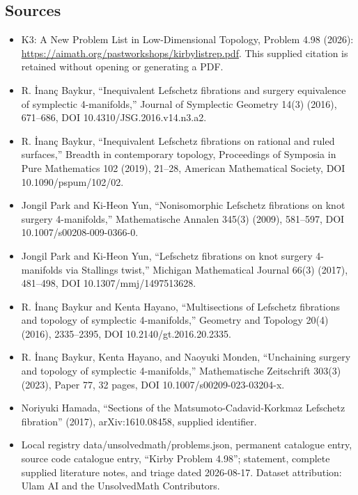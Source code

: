 \documentclass[11pt]{article}
\begin{document}
\subsection{Sources}
\begin{itemize}
\item K3: A New Problem List in Low-Dimensional Topology, Problem 4.98 (2026): \url{https://aimath.org/pastworkshops/kirbylistrep.pdf}. This supplied citation is retained without opening or generating a PDF.
\item [Bay16] R. İnanç Baykur, ``Inequivalent Lefschetz fibrations and surgery equivalence of symplectic 4-manifolds,'' Journal of Symplectic Geometry 14(3) (2016), 671--686, DOI 10.4310/JSG.2016.v14.n3.a2.
\item [Bay19] R. İnanç Baykur, ``Inequivalent Lefschetz fibrations on rational and ruled surfaces,'' Breadth in contemporary topology, Proceedings of Symposia in Pure Mathematics 102 (2019), 21--28, American Mathematical Society, DOI 10.1090/pspum/102/02.
\item [PY09] Jongil Park and Ki-Heon Yun, ``Nonisomorphic Lefschetz fibrations on knot surgery 4-manifolds,'' Mathematische Annalen 345(3) (2009), 581--597, DOI 10.1007/s00208-009-0366-0.
\item [PY17] Jongil Park and Ki-Heon Yun, ``Lefschetz fibrations on knot surgery 4-manifolds via Stallings twist,'' Michigan Mathematical Journal 66(3) (2017), 481--498, DOI 10.1307/mmj/1497513628.
\item [BH16b] R. İnanç Baykur and Kenta Hayano, ``Multisections of Lefschetz fibrations and topology of symplectic 4-manifolds,'' Geometry and Topology 20(4) (2016), 2335--2395, DOI 10.2140/gt.2016.20.2335.
\item [BHM23] R. İnanç Baykur, Kenta Hayano, and Naoyuki Monden, ``Unchaining surgery and topology of symplectic 4-manifolds,'' Mathematische Zeitschrift 303(3) (2023), Paper 77, 32 pages, DOI 10.1007/s00209-023-03204-x.
\item [Ham17] Noriyuki Hamada, ``Sections of the Matsumoto-Cadavid-Korkmaz Lefschetz fibration'' (2017), arXiv:1610.08458, supplied identifier.
\item Local registry data/unsolvedmath/problems.json, permanent catalogue entry, source code catalogue entry, ``Kirby Problem 4.98''; statement, complete supplied literature notes, and triage dated 2026-08-17. Dataset attribution: Ulam AI and the UnsolvedMath Contributors.
\end{itemize}
\end{document}
